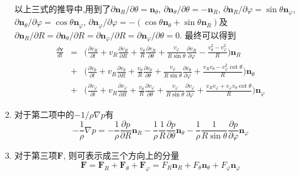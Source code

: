 \begin{solution}
\begin{enumerate}
以上三式的推导中,用到了$\partial\mathbf{n}_R/\partial\theta=\mathbf{n}_\theta$, $\partial\mathbf{n}_\theta/\partial\theta=-\mathbf{n}_R$, $\partial\mathbf{n}_R/\partial\varphi=\sin\theta\mathbf{n}_\varphi$,
$\partial\mathbf{n}_\theta/\partial\varphi=\cos\theta\mathbf{n}_\varphi$,
$\partial\mathbf{n}_\varphi/\partial\varphi=-(\cos\theta\mathbf{n}_\theta + \sin\theta\mathbf{n}_R)$及
$\partial\mathbf{n}_R/\partial R=\partial\mathbf{n}_\theta/\partial R=\partial\mathbf{n}_\varphi/\partial R =\partial\mathbf{n}_\varphi/\partial \theta=0$. 最终可以得到
\begin{eqnarray}
\frac{d\mathbf{v}}{dt}
& = &
\Big(\frac{\partial v_R}{\partial t} +
       v_R\frac{\partial v_R}{\partial R}
    +  \frac{v_\theta}{R}\frac{\partial v_R}{\partial\theta}+\frac{v_\varphi}{R\sin\theta}\frac{\partial v_R}{\partial\varphi}-\frac{v_\theta^2-v_\varphi^2}{R}\Big)\mathbf{n}_R\nonumber\\
& + &
\Big(\frac{\partial v_\theta}{\partial t} +
       v_R\frac{\partial v_\theta}{\partial R}
   + \frac{v_\theta}{R}\frac{\partial v_\theta}{\partial\theta}+\frac{v_\varphi}{R\sin\theta}\frac{\partial v_\theta}{\partial\varphi}+\frac{v_Rv_\theta-v_\varphi^2\cot\theta}{R} \Big)\mathbf{n}_\theta\nonumber\\
& +&
\Big(\frac{\partial v_\varphi}{\partial t} +
       v_R\frac{\partial v_\varphi}{\partial R}
    +  \frac{v_\theta}{R}\frac{\partial v_\varphi}{\partial\theta}+\frac{v_\varphi}{R\sin\theta}\frac{\partial v_\varphi}{\partial\varphi}
+\frac{v_Rv_\varphi+v_\varphi v_\theta \cot\theta}{R}\Big)\mathbf{n}_\varphi
\end{eqnarray}

\item 对于第二项中的$-1/\rho\nabla p$有
\begin{equation}
-\frac{1}{\rho}\nabla p =
-\frac{1}{\rho}\frac{\partial p}{\partial R}\mathbf{n}_R
-\frac{1}{\rho}\frac{1}{R}\frac{\partial p}{\partial\theta}\mathbf{n}_\theta
-\frac{1}{\rho}\frac{1}{R\sin\theta}\frac{\partial p}{\partial \varphi}\mathbf{n}_\varphi
\end{equation}

\item 对于第三项$\mathbf{F}$, 则可表示成三个方向上的分量
\begin{equation}
\mathbf{F} = \mathbf{F}_R + \mathbf{F}_\theta + \mathbf{F}_\varphi = F_R\mathbf{n}_R + F_\theta\mathbf{n}_\theta + F_\varphi\mathbf{n}_\varphi
\end{equation}


\end{enumerate}
\end{solution}
